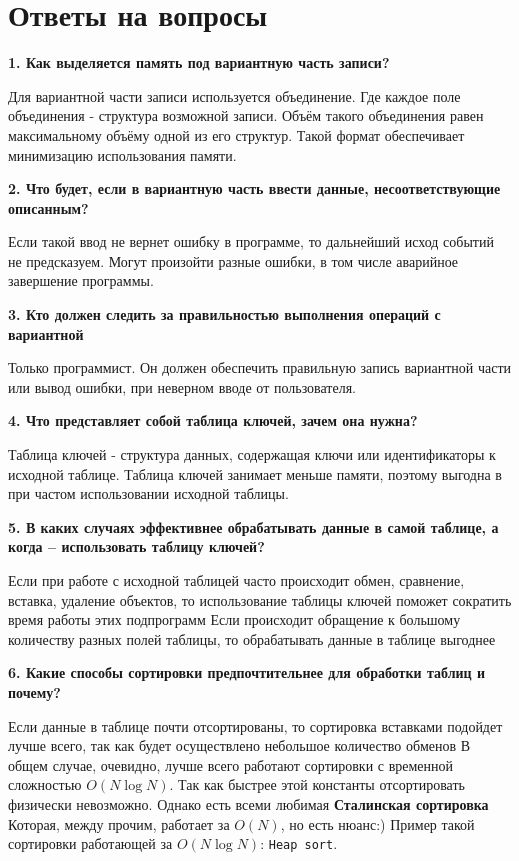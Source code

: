 \section{Ответы на вопросы}
\noindent\textbf{1. Как выделяется память под вариантную часть записи?}\par
Для вариантной части записи используется объединение. Где каждое поле объединения - структура возможной записи. Объём такого объединения равен максимальному объёму одной из его структур. Такой формат обеспечивает минимизацию использования памяти.\newline

\noindent\textbf{2. Что будет, если в вариантную часть ввести данные, несоответствующие
описанным?}\par
Если такой ввод не вернет ошибку в программе, то дальнейший исход событий не предсказуем. Могут произойти разные ошибки, в том числе аварийное завершение программы. \newline

\noindent\textbf{3. Кто должен следить за правильностью выполнения операций с вариантной}\par
Только программист. Он должен обеспечить правильную запись вариантной части или вывод ошибки, при неверном вводе от пользователя.\newline

\noindent\textbf{4. Что представляет собой таблица ключей, зачем она нужна?}\par
Таблица ключей - структура данных, содержащая ключи или идентификаторы к исходной таблице. Таблица ключей занимает меньше памяти, поэтому выгодна в при частом использовании исходной таблицы.\newline

\noindent\textbf{5. В каких случаях эффективнее обрабатывать данные в самой таблице, а когда –
	использовать таблицу ключей?}\par
Если при работе с исходной таблицей часто происходит обмен, сравнение, вставка, удаление объектов, то использование таблицы ключей поможет сократить время работы этих подпрограмм
Если происходит обращение к большому количеству разных полей таблицы, то обрабатывать данные в таблице выгоднее\newline

\noindent\textbf{6. Какие способы сортировки предпочтительнее для обработки таблиц и почему?}\par
Если данные в таблице почти отсортированы, то сортировка вставками подойдет лучше всего, так как будет осуществлено небольшое количество обменов
\newline
В общем случае, очевидно, лучше всего работают сортировки с временной сложностью $O(N \log N)$. Так как быстрее этой константы отсортировать физически невозможно. Однако есть всеми любимая \textbf{Сталинская сортировка} Которая, между прочим, работает за $O(N)$, но есть нюанс:)\newline 
Пример такой сортировки работающей за $O(N \log N)$: \texttt{Heap sort}.